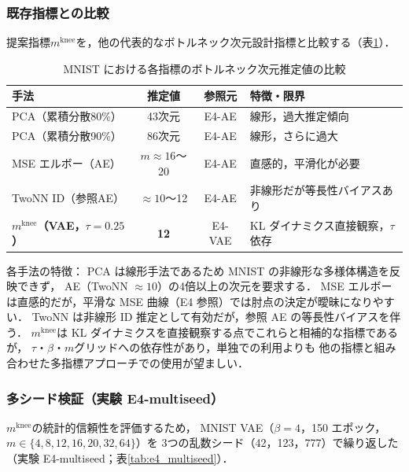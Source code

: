 \documentclass[11pt,a4paper]{jsarticle}
\newcommand{\mknee}{m^{\mathrm{knee}}}
\begin{document}
\subsubsection{既存指標との比較}\label{sec:exp_comparison}

提案指標$\mknee$を，他の代表的なボトルネック次元設計指標と比較する（表\ref{tab:method_comparison}）．

\begin{table}[H]
\centering
\caption{MNIST における各指標のボトルネック次元推定値の比較}
\label{tab:method_comparison}
\small
\begin{tabular}{lccl}
\toprule
手法 & 推定値 & 参照元 & 特徴・限界 \\
\midrule
PCA（累積分散80\%） & 43次元 & E4-AE & 線形，過大推定傾向 \\
PCA（累積分散90\%） & 86次元 & E4-AE & 線形，さらに過大 \\
MSE エルボー（AE） & $m \approx 16$〜20 & E4-AE & 直感的，平滑化が必要 \\
TwoNN ID（参照AE） & $\approx 10$〜12 & E4-AE & 非線形だが等長性バイアスあり \\
\textbf{$\mknee$（VAE，$\tau=0.25$）} & \textbf{12} & E4-VAE & KL ダイナミクス直接観察，$\tau$依存 \\
\bottomrule
\end{tabular}
\end{table}

各手法の特徴：
PCA は線形手法であるため MNIST の非線形な多様体構造を反映できず，
AE（TwoNN $\approx 10$）の4倍以上の次元を要求する．
MSE エルボーは直感的だが，平滑な MSE 曲線（E4 参照）では肘点の決定が曖昧になりやすい．
TwoNN は非線形 ID 推定として有効だが，参照 AE の等長性バイアスを伴う．
$\mknee$は KL ダイナミクスを直接観察する点でこれらと相補的な指標であるが，
$\tau$・$\beta$・$m$グリッドへの依存性があり，単独での利用よりも
他の指標と組み合わせた多指標アプローチでの使用が望ましい．

\subsubsection{多シード検証（実験 E4-multiseed）}\label{sec:exp_multiseed}

$\mknee$の統計的信頼性を評価するため，
MNIST VAE（$\beta = 4$，150 エポック，$m \in \{4,8,12,16,20,32,64\}$）を
3つの乱数シード（42，123，777）で繰り返した（実験 E4-multiseed；表\ref{tab:e4_multiseed}）．
\end{document}
